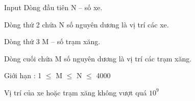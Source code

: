 Input
Dòng đầu tiên N – số xe.   


   Dòng thứ 2 chứa N số nguyên dương là vị trí các xe.   


   Dòng thứ 3 M – số trạm xăng.   


   Dòng cuối chứa M số nguyên dương là vị trí các trạm xăng.  

    Giới hạn :      1 $\le$  M  $\le$  N  $\le$  4000   


   Vị trí của xe hoặc trạm xăng không vượt quá $10^{9}$